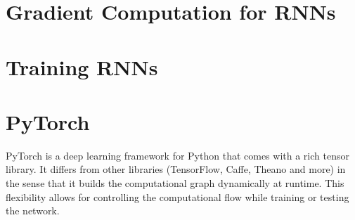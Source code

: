 	\section{Gradient Computation for RNNs}
	
	\section{Training RNNs}
		
	\section{PyTorch}
		PyTorch is a deep learning framework for Python that comes with a rich tensor library.
		It differs from other libraries (TensorFlow, Caffe, Theano and more) in the sense that it builds the computational graph dynamically at runtime.
		This flexibility allows for controlling the computational flow while training or testing the network.